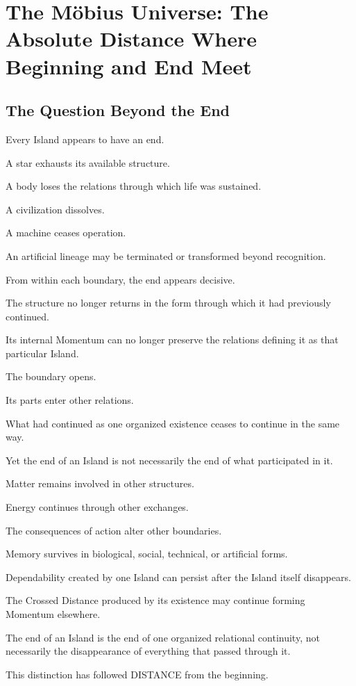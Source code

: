 \section{The Möbius Universe: The Absolute Distance Where Beginning and End Meet}

\subsection*{\textbf{The Question Beyond the End}} 
Every Island appears to have an end.

A star exhausts its available structure.

A body loses the relations through which life was sustained.

A civilization dissolves.

A machine ceases operation.

An artificial lineage may be terminated or transformed beyond recognition.

From within each boundary, the end appears decisive.

The structure no longer returns in the form through which it had previously continued.

Its internal Momentum can no longer preserve the relations defining it as that particular Island.

The boundary opens.

Its parts enter other relations.

What had continued as one organized existence ceases to continue in the same way.

Yet the end of an Island is not necessarily the end of what participated in it.

Matter remains involved in other structures.

Energy continues through other exchanges.

The consequences of action alter other boundaries.

Memory survives in biological, social, technical, or artificial forms.

Dependability created by one Island can persist after the Island itself disappears.

The Crossed Distance produced by its existence may continue forming Momentum elsewhere.

The end of an Island is the end of one organized relational continuity, not necessarily the disappearance of everything that passed through it.

This distinction has followed DISTANCE from the beginning.

